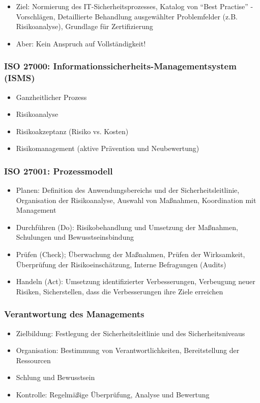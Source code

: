 \begin{itemize}
	\item Ziel: Normierung des IT-Sicherheitsprozesses, Katalog von "`Best Practise"' - Vorschlägen, Detaillierte Behandlung ausgewählter Problemfelder (z.B. Risikoanalyse), Grundlage für Zertifizierung
	\item Aber: Kein Anspruch auf Vollständigkeit!
\end{itemize}

\subsubsection{ISO 27000: Informationssicherheits-Managementsystem (ISMS)}
\begin{itemize}
	\item Ganzheitlicher Prozess
	\item Risikoanalyse
	\item Risikoakzeptanz (Risiko vs. Kosten)
	\item Risikomanagement (aktive Prävention und Neubewertung)
\end{itemize}

\subsubsection{ISO 27001: Prozessmodell}
\begin{itemize}
	\item Planen: Definition des Anwendungsbereichs und der Sicherheitsleitlinie, Organisation der Risikoanalyse, Auswahl von Maßnahmen, Koordination mit Management
	\item Durchführen (Do): Risikobehandlung und Umsetzung der Maßnahmen, Schulungen und Bewusstseinsbindung
	\item Prüfen (Check); Überwachung der Maßnahmen, Prüfen der Wirksamkeit, Überprüfung der Risikoeinschätzung, Interne Befragungen (Audits)
	\item Handeln (Act): Umsetzung identifizierter Verbesserungen, Verbeugung neuer Risiken, Sicherstellen, dass die Verbesserungen ihre Ziele erreichen
\end{itemize}

\subsubsection{Verantwortung des Managements}
\begin{itemize}
	\item Zielbildung: Festlegung der Sicherheitsleitlinie und des Sicherheitsniveaus
	\item Organisation: Bestimmung von Verantwortlichkeiten, Bereitstellung der Ressourcen
	\item Schlung und Bewusstsein
	\item Kontrolle: Regelmäßige Überprüfung, Analyse und Bewertung
\end{itemize}

